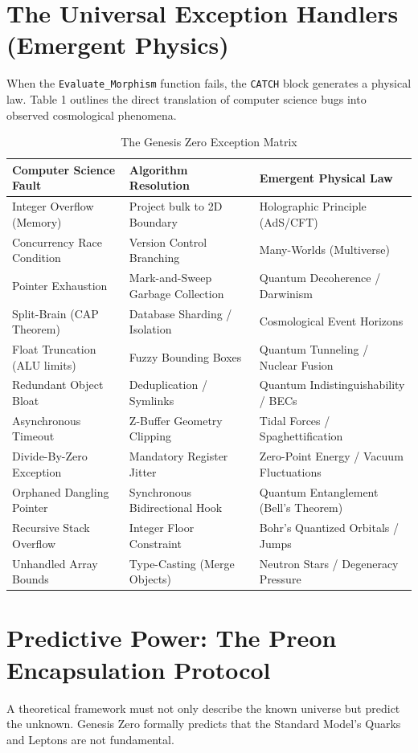 \documentclass[11pt, a4paper]{article}
\begin{document}
\section{The Universal Exception Handlers (Emergent Physics)}
When the \texttt{Evaluate\_Morphism} function fails, the \texttt{CATCH} block generates a physical law. Table 1 outlines the direct translation of computer science bugs into observed cosmological phenomena.

\begin{table}[h]
\centering
\caption{The Genesis Zero Exception Matrix}
\vspace{0.2cm}
\begin{tabularx}{\textwidth}{>{\centering\arraybackslash}l >{\centering\arraybackslash}X >{\centering\arraybackslash}X}
\toprule
\textbf{Computer Science Fault} & \textbf{Algorithm Resolution} & \textbf{Emergent Physical Law} \\
\midrule
Integer Overflow (Memory) & Project bulk to 2D Boundary & Holographic Principle (AdS/CFT) \\
Concurrency Race Condition & Version Control Branching & Many-Worlds (Multiverse) \\
Pointer Exhaustion & Mark-and-Sweep Garbage Collection & Quantum Decoherence / Darwinism \\
Split-Brain (CAP Theorem) & Database Sharding / Isolation & Cosmological Event Horizons \\
Float Truncation (ALU limits) & Fuzzy Bounding Boxes & Quantum Tunneling / Nuclear Fusion \\
Redundant Object Bloat & Deduplication / Symlinks & Quantum Indistinguishability / BECs \\
Asynchronous Timeout & Z-Buffer Geometry Clipping & Tidal Forces / Spaghettification \\
Divide-By-Zero Exception & Mandatory Register Jitter & Zero-Point Energy / Vacuum Fluctuations \\
Orphaned Dangling Pointer & Synchronous Bidirectional Hook & Quantum Entanglement (Bell's Theorem) \\
Recursive Stack Overflow & Integer Floor Constraint & Bohr's Quantized Orbitals / Jumps \\
Unhandled Array Bounds & Type-Casting (Merge Objects) & Neutron Stars / Degeneracy Pressure \\
\bottomrule
\end{tabularx}
\end{table}

\section{Predictive Power: The Preon Encapsulation Protocol}
A theoretical framework must not only describe the known universe but predict the unknown. Genesis Zero formally predicts that the Standard Model's Quarks and Leptons are not fundamental.
\end{document}
